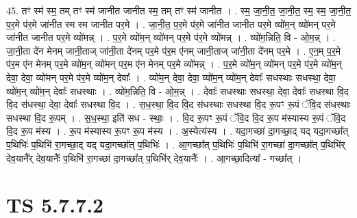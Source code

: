 \documentclass[17pt]{extarticle}
\begin{document}
45. तꣳ स्म॑ स्म॒ तम् तꣳ स्म॑ जानीत जानीत स्म॒ तम् तꣳ स्म॑ जानीत । . स्म॒ जा॒नी॒त॒ जा॒नी॒त॒ स्म॒ स्म॒ जा॒नी॒त॒ प॒र॒मे प॑र॒मे जा॑नीत स्म स्म जानीत पर॒मे । . जा॒नी॒त॒ प॒र॒मे प॑र॒मे जा॑नीत जानीत पर॒मे व्यो॑म॒न् व्यो॑मन् पर॒मे जा॑नीत जानीत पर॒मे व्यो॑मन्न् । . प॒र॒मे व्यो॑म॒न् व्यो॑मन् पर॒मे प॑र॒मे व्यो॑मन्न् । . व्यो॑म॒न्निति॒ वि - ओ॒म॒न्न् । . जा॒नी॒ता दे॑न मेनम् जानी॒ताज् जा॑नी॒ता दे॑नम् पर॒मे प॑र॒म ए॑नम् जानी॒ताज् जा॑नी॒ता दे॑नम् पर॒मे । . ए॒न॒म् प॒र॒मे प॑र॒म ए॑न मेनम् पर॒मे व्यो॑म॒न् व्यो॑मन् पर॒म ए॑न मेनम् पर॒मे व्यो॑मन्न् । . प॒र॒मे व्यो॑म॒न् व्यो॑मन् पर॒मे प॑र॒मे व्यो॑म॒न् देवा॒ देवा॒ व्यो॑मन् पर॒मे प॑र॒मे व्यो॑म॒न् देवाः᳚ । . व्यो॑म॒न् देवा॒ देवा॒ व्यो॑म॒न् व्यो॑म॒न् देवाः᳚ सधस्थाः सधस्था॒ देवा॒ व्यो॑म॒न् व्यो॑म॒न् देवाः᳚ सधस्थाः । . व्यो॑म॒न्निति॒ वि - ओ॒म॒न्न् । . देवाः᳚ सधस्थाः सधस्था॒ देवा॒ देवाः᳚ सधस्था वि॒द वि॒द स॑धस्था॒ देवा॒ देवाः᳚ सधस्था वि॒द । . स॒ध॒स्था॒ वि॒द वि॒द स॑धस्थाः सधस्था वि॒द रू॒पꣳ रू॒पं ॅवि॒द स॑धस्थाः सधस्था वि॒द रू॒पम् । . स॒ध॒स्था॒ इति॑ सध - स्थाः॒ । . वि॒द रू॒पꣳ रू॒पं ॅवि॒द वि॒द रू॒प म॑स्यास्य रू॒पं ॅवि॒द वि॒द रू॒प म॑स्य । . रू॒प म॑स्यास्य रू॒पꣳ रू॒प म॑स्य । . अ॒स्येत्य॑स्य । . यदा॒गच्छा॑ दा॒गच्छा॒द् यद् यदा॒गच्छा᳚त् प॒थिभिः॑ प॒थिभि॑ रा॒गच्छा॒द् यद् यदा॒गच्छा᳚त् प॒थिभिः॑ । . आ॒गच्छा᳚त् प॒थिभिः॑ प॒थिभि॑ रा॒गच्छा॑ दा॒गच्छा᳚त् प॒थिभि॑र् देव॒यानै᳚र् देव॒यानैः᳚ प॒थिभि॑ रा॒गच्छा॑ दा॒गच्छा᳚त् प॒थिभि॑र् देव॒यानैः᳚ । . आ॒गच्छा॒दित्या᳚ - गच्छा᳚त् । \newline
\pagebreak
{}

\section{ TS 5.7.7.2 }
\end{document}
